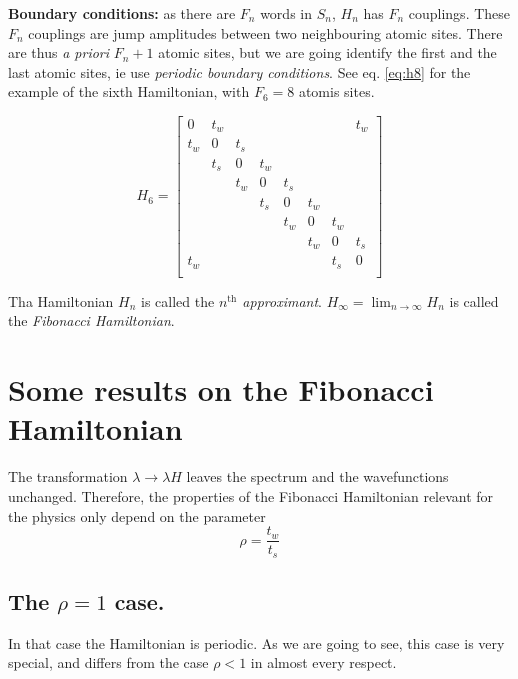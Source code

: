 \documentclass[11pt]{article}
\begin{document}
\textbf{Boundary conditions:} as there are $F_n$ words in $S_n$, $H_n$ has $F_n$ couplings. These $F_n$ couplings are jump amplitudes between two neighbouring atomic sites. There are thus \textit{a priori} $F_n + 1$ atomic sites, but we are going identify the first and the last atomic sites, ie use \textit{periodic boundary conditions}.
See eq. \eqref{eq:h8} for the example of the sixth Hamiltonian, with $F_6 = 8$ atomis sites.

\begin{equation}
\label{eq:h8} 
	H_6 = 
	\begin{bmatrix}
	0 & t_w &   &   &   &   &   & t_w\\
	t_w & 0 & t_s &   &   &   &   &  \\
	  & t_s & 0 & t_w &   &   &   &  \\
	  &   & t_w & 0 & t_s &   &   &  \\
	  &   &   & t_s & 0 & t_w &   &  \\
	  &   &   &   & t_w & 0 & t_w &  \\
	  &   &   &   &   & t_w & 0 & t_s\\
	t_w &   &   &   &   &   & t_s & 0\\
\end{bmatrix}
\end{equation}

Tha Hamiltonian $H_n$ is called the \textit{$n^\text{th}$ approximant}. $H_\infty = \lim_{n \rightarrow \infty} H_n$ is called the \textit{Fibonacci Hamiltonian}.

\section{Some results on the Fibonacci Hamiltonian}

The transformation $\lambda \rightarrow \lambda H$ leaves the spectrum and the wavefunctions unchanged.
Therefore, the properties of the Fibonacci Hamiltonian relevant for the physics only depend on the parameter
\begin{equation}
	\rho = \frac{t_w}{t_s}
\end{equation}

\subsection{The $\rho = 1$ case.}

In that case the Hamiltonian is periodic. As we are going to see, this case is very special, and differs from the case $\rho < 1$ in almost every respect.
\end{document}

